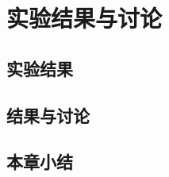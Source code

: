 
\chapter{实验结果与讨论}\label{ch:experiment}

\section{实验结果}\label{sec:experiment_result}

\section{结果与讨论}\label{sec:result_and_discussion}

\section{本章小结}\label{sec:experiment_conclusion}
